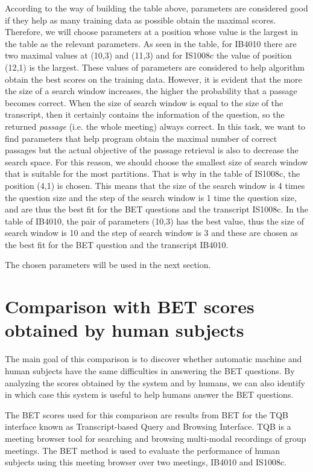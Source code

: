 According to the way of building the table above, parameters are considered good if they help as many training data as possible obtain the maximal scores. Therefore, we will choose parameters at a position whose value is the largest in the table as the relevant parameters. As seen in the table, for IB4010 there are two maximal values at (10,3) and (11,3) and for IS1008c the value of position (12,1) is the largest. These values of parameters are considered to help algorithm obtain the best scores on the training data. However, it is evident that the more the size of a search window increases, the higher the probability that a passage becomes correct. When the size of search window is equal to the size of the transcript, then it certainly contains the information of the question, so the returned \textit{passage} (i.e. the whole meeting) always correct. In this task, we want to find parameters that help program obtain the maximal number of correct passages but the actual objective of the passage retrieval is also to decrease the search space. For this reason, we should choose the smallest size of search window that is suitable for the most partitions. That is why in the table of IS1008c, the position (4,1) is chosen. This means that the size of the search window is 4 times the question size and the step of the search window is 1 time the question size, and are thus the best fit for the BET questions and the transcript IS1008c. 
In the table of IB4010, the pair of parameters (10,3) has the best value, thus the size of search window is 10 and the step of search window is 3 and these are chosen as the best fit for the BET question and the transcript IB4010.

The chosen parameters will be used in the next section.




\section{Comparison with BET scores obtained by human subjects}

 The main goal of this comparison is to discover whether automatic machine and human subjects have the same difficulties in answering the BET questions. By analyzing the scores obtained by the system and by humans, we can also identify in which case this system is useful to help humans answer the BET questions. 

The BET scores used for this comparison are results from BET for the TQB interface \cite{popescubelis2007otm} known as Transcript-based Query and Browsing Interface. TQB is a meeting browser tool for searching and browsing multi-modal recordings of group meetings. The BET method is used to evaluate the performance of human subjects using this meeting browser over two meetings, IB4010 and IS1008c.

